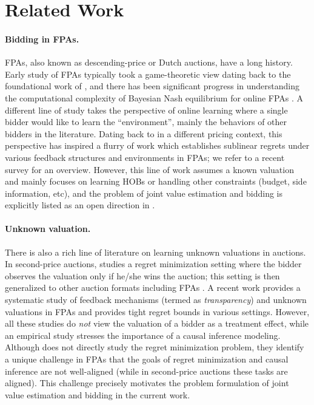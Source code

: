 \section{Related Work}
\paragraph{Bidding in FPAs.} FPAs, also known as descending-price or Dutch auctions, have a long history. Early study of FPAs typically took a game-theoretic view dating back to the foundational work of \cite{vickrey1961counterspeculation, myerson1981optimal}, and there has been significant progress in understanding the computational complexity of Bayesian Nash equilibrium for online FPAs \cite{wang2020bayesian,filos2021complexity,bichler2023computing,chen2023complexity,filos2024computation}. A different line of study takes the perspective of online learning where a single bidder would like to learn the ``environment'', mainly the behaviors of other bidders in the literature. Dating back to \cite{kleinberg2003value} in a different pricing context, this perspective has inspired a flurry of work \cite{han2020learning,zhang2022leveraging,balseiro2023contextual,badanidiyuru2023learning,wang2023learning,han2024optimal,aggarwal2024no} which establishes sublinear regrets under various feedback structures and environments in FPAs; we refer to a recent survey \cite{aggarwal2024auto} for an overview. However, this line of work assumes a known valuation and mainly focuses on learning HOBs or handling other constraints (budget, side information, etc), and the problem of joint value estimation and bidding is explicitly listed as an open direction in \cite{han2024optimal}.

\paragraph{Unknown valuation.} There is also a rich line of literature on learning unknown valuations in auctions. In second-price auctions, \cite{weed2016online} studies a regret minimization setting where the bidder observes the valuation only if he/she wins the auction; this setting is then generalized to other auction formats \cite{feng2018learning} including FPAs \cite{achddou2021fast}. A recent work \cite{cesa2024role} provides a systematic study of feedback mechanisms (termed as \emph{transparency}) and unknown valuations in FPAs and provides tight regret bounds in various settings. However, all these studies do \emph{not} view the valuation of a bidder as a treatment effect, while an empirical study \cite{waisman2024online} stresses the importance of a causal inference modeling. Although \cite{waisman2024online} does not directly study the regret minimization problem, they identify a unique challenge in FPAs that the goals of regret minimization and causal inference are not well-aligned (while in second-price auctions these tasks are aligned). This challenge precisely motivates the problem formulation of joint value estimation and bidding in the current work. 

